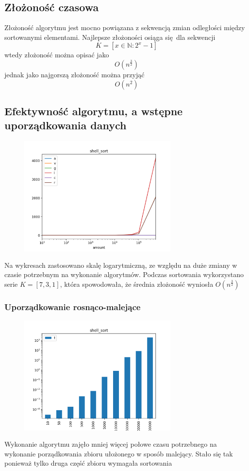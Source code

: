 \documentclass[]{article}
\begin{document}
	\subsection{Złożoność czasowa}
		Złożoność algorytmu jest mocno powiązana z sekwencją zmian odległości między sortowanymi elementami. Najlepsze złożoności osiąga się dla sekwencji
		\[
		K = [x \in \mathbb{N}: 2^x - 1]
		\]
		wtedy złożoność można opisać jako
		\[
		O(n^{\frac{3}{2}})
		\]
		jednak jako najgorszą złożoność można przyjąć
		\[
		O(n^2)
		\]
	\subsection{Efektywność algorytmu, a wstępne uporządkowania danych}
		\begin{figure}[H]
			\centering
			\includegraphics[width=8cm]{shell_sort_gather.png}	
		\end{figure}
		Na wykresach zastosowano skalę logarytmiczną, ze względu na duże zmiany w czasie potrzebnym na wykonanie algorytmów.
		Podczas sortowania wykorzystano serie $ K = [7, 3, 1] $, która spowodowała, że średnia złożoność wyniosła $ O(n^\frac{3}{2})$
		\subsubsection{Uporządkowanie rosnąco-malejące}
		\begin{figure}[H]
			\centering
			\includegraphics[width=8cm]{shell_sort_a.png}	
		\end{figure}
		Wykonanie algorytmu zajęło mniej więcej połowe czasu potrzebnego na wykonanie porządkowania zbioru ułożonego w sposób malejący. Stało się tak ponieważ tylko druga część zbioru wymagała sortowania
\end{document}
